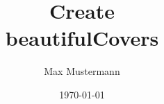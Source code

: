 \documentclass[a4paper,twoside,frame]{Article}
\author{Max Mustermann}
\title{Create\\ beautiful\newline Covers}
\date{\today}
\begin{document}
\maketitle
\lipsum
\end{document}
